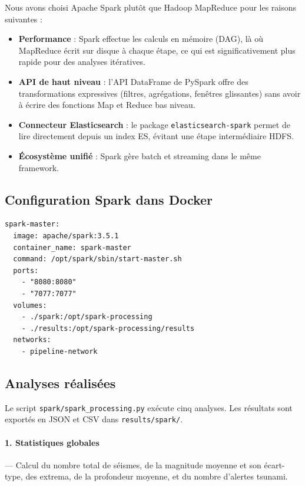 \documentclass[12pt,a4paper]{article}
\begin{document}
Nous avons choisi Apache Spark plutôt que Hadoop MapReduce pour les raisons suivantes :

\begin{itemize}[noitemsep]
    \item \textbf{Performance} : Spark effectue les calculs en mémoire (DAG), là où MapReduce écrit sur disque à chaque étape, ce qui est significativement plus rapide pour des analyses itératives.
    \item \textbf{API de haut niveau} : l'API DataFrame de PySpark offre des transformations expressives (filtres, agrégations, fenêtres glissantes) sans avoir à écrire des fonctions Map et Reduce bas niveau.
    \item \textbf{Connecteur Elasticsearch} : le package \texttt{elasticsearch-spark} permet de lire directement depuis un index ES, évitant une étape intermédiaire HDFS.
    \item \textbf{Écosystème unifié} : Spark gère batch et streaming dans le même framework.
\end{itemize}

\subsection{Configuration Spark dans Docker}

\begin{lstlisting}[style=config, caption={Configuration Docker Compose pour Spark}]
spark-master:
  image: apache/spark:3.5.1
  container_name: spark-master
  command: /opt/spark/sbin/start-master.sh
  ports:
    - "8080:8080"
    - "7077:7077"
  volumes:
    - ./spark:/opt/spark-processing
    - ./results:/opt/spark-processing/results
  networks:
    - pipeline-network
\end{lstlisting}

\subsection{Analyses réalisées}

Le script \texttt{spark/spark\_processing.py} exécute cinq analyses. Les résultats sont exportés en JSON et CSV dans \texttt{results/spark/}.

\paragraph{1. Statistiques globales} — Calcul du nombre total de séismes, de la magnitude moyenne et son écart-type, des extrema, de la profondeur moyenne, et du nombre d'alertes tsunami.
\end{document}
